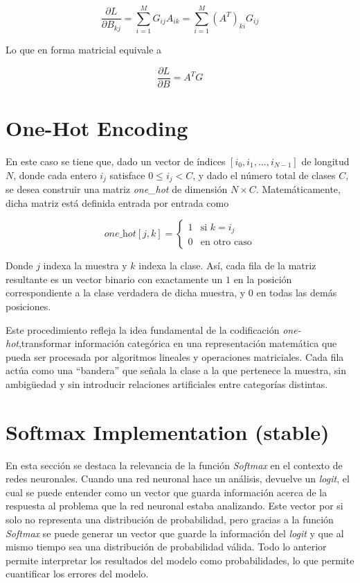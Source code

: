 \documentclass[12pt, letterpaper]{article}
\begin{document}
\[
\frac{\partial L}{\partial B_{kj}} = \sum_{i=1}^{M} G_{ij} A_{ik} = 
\sum_{i=1}^{M} (A^T)_{ki} G_{ij}
\]



Lo que en forma matricial equivale a



\[
\frac{\partial L}{\partial B} = A^T G
\]


\newpage

\section{One-Hot Encoding}
En este caso se tiene que, dado un vector de índices \([i_0, i_1, \ldots, i_{N-1}]\) de longitud \(N\), donde cada entero \(i_j\) satisface \(0 \leq i_j < C\), y dado el número total de clases \(C\), se desea construir una matriz \textit{one\_hot} de dimensión \(N \times C\). Matemáticamente, dicha matriz está definida entrada por entrada como

\[
\textit{one\_hot}[j, k] = 
\begin{cases} 
	1 & \text{si } k = i_j \\ 
	0 & \text{en otro caso} 
\end{cases}
\]



Donde \(j\) indexa la muestra y \(k\) indexa la clase. Así, cada fila de la matriz resultante es un vector binario con exactamente un \(1\) en la posición correspondiente a la clase verdadera de dicha muestra, y \(0\) en todas las demás posiciones.

Este procedimiento refleja la idea fundamental de la codificación \textit{one-hot},transformar información categórica en una representación matemática que pueda ser procesada por algoritmos lineales y operaciones matriciales. Cada fila actúa como una “bandera” que señala la clase a la que pertenece la muestra, sin ambigüedad y sin introducir relaciones artificiales entre categorías distintas. 

\newpage

\section{Softmax Implementation (stable)}

En esta sección se destaca la relevancia de la función \textit{Softmax} en el contexto de redes neuronales. Cuando 
una red neuronal hace un análisis, devuelve un \textit{logit}, el cual se puede entender como un vector que guarda información acerca 
de la respuesta al problema que la red neuronal estaba analizando. Este vector por si solo no representa una distribución de probabilidad, pero 
gracias a la función \textit{Softmax} se puede generar un vector que guarde la información del \textit{logit} y que al mismo tiempo sea una distribución 
de probabilidad válida. Todo lo anterior permite interpretar los resultados del modelo como probabilidades, lo que permite cuantificar los errores del modelo.
\end{document}
